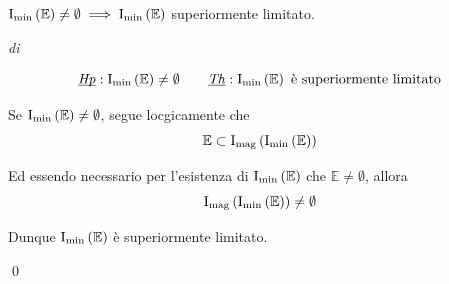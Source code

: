 \begin{corollary}
    \label{cor:min-sup-lim}
    $\operatorname{I_{min}\left(\mathbb{E}\right)} \neq\emptyset \implies \operatorname{I_{min}\left(\mathbb{E}\right)}$ superiormente limitato.
\end{corollary}
\begin{demonstration}
    \textit{di} 

    \[\underbar{\textit{Hp}}: \operatorname{I_{min}\left(\mathbb{E}\right)} \neq\emptyset \qquad \underbar{\textit{Th}}: \operatorname{I_{min}\left(\mathbb{E}\right)} \text{ è superiormente limitato}\]

    \begin{list_2}
        \item Se $\operatorname{I_{min}\left(\mathbb{E}\right)} \neq\emptyset$, segue locgicamente che
            \[ \mathbb{E}\subset \operatorname{I_{mag}\left(\operatorname{I_{min}\left(\mathbb{E}\right)}\right)} \]
        \item Ed essendo necessario per l'esistenza di $\operatorname{I_{min}\left(\mathbb{E}\right)}$ che $\mathbb{E} \neq\emptyset$, allora
            \[ \operatorname{I_{mag}\left(\operatorname{I_{min}\left(\mathbb{E}\right)}\right)} \neq\emptyset\]
        \item Dunque $\operatorname{I_{min}\left(\mathbb{E}\right)}$ è superiormente limitato.
    \end{list_2}
    \qed
\end{demonstration}

